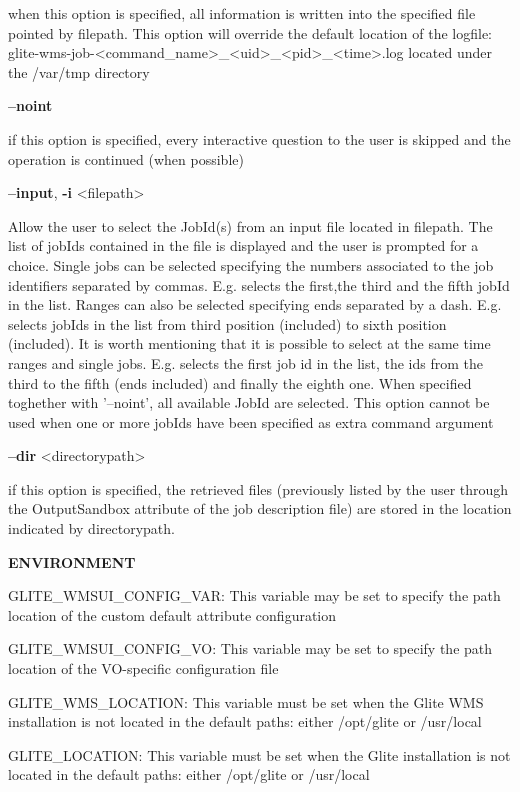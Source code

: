 {when this option is specified, all information is written into the specified file pointed by filepath.
This option will override the default location of the logfile:
glite-wms-job-<command\_name>\_<uid>\_<pid>\_<time>.log  located under the /var/tmp directory

\textbf{--noint}

if this option is specified, every interactive question to the user is skipped and the operation is continued (when possible)

\textbf{--input}, \textbf{-i} <filepath>

Allow the user to select the JobId(s) from an input file located in filepath.
The list of jobIds contained in the file is displayed and the user is prompted for a choice. Single jobs can be selected specifying the numbers associated to the job identifiers separated by commas. E.g. selects the first,the third and the fifth jobId in the list.
Ranges can also be selected specifying ends separated by a dash. E.g. selects jobIds in the list from third position (included) to sixth position (included). It is worth mentioning that it is possible to select at the same time ranges and single jobs. E.g. selects the first job id in the list, the ids from the third to the fifth (ends included) and finally the eighth one.
When specified toghether with '--noint', all available JobId are selected.
This option cannot be used when one or more jobIds have been specified as extra command argument

\textbf{--dir} <directorypath>

if this option is specified, the retrieved files (previously listed by the user through the OutputSandbox attribute of the job description file) are stored in the location indicated by directorypath.


\medskip
\textbf{ENVIRONMENT}
\smallskip


GLITE\_WMSUI\_CONFIG\_VAR:  This variable may be set to specify the path location of the custom default attribute configuration

GLITE\_WMSUI\_CONFIG\_VO: This variable may be set to specify the path location of the VO-specific configuration file

GLITE\_WMS\_LOCATION:  This variable must be set when the Glite WMS installation is not located in the default paths: either /opt/glite or /usr/local

GLITE\_LOCATION: This variable must be set when the Glite installation is not located in the default paths: either /opt/glite or /usr/local


}
